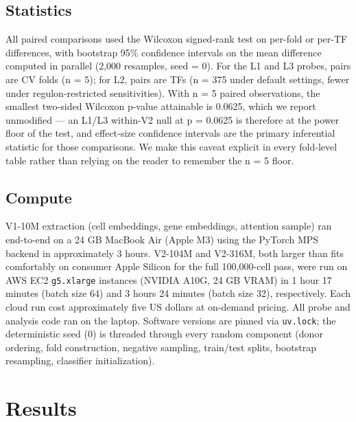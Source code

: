\documentclass[
  11pt,
]{article}
\begin{document}
\subsection{Statistics}\label{statistics}

All paired comparisons used the Wilcoxon signed-rank test \citep{wilcoxon1945} on per-fold or per-TF differences, with bootstrap 95\% confidence
intervals on the mean difference \citep{efron1979bootstrap} computed
in parallel (2,000 resamples, seed = 0). For the L1 and L3 probes, pairs are CV folds (n = 5); for
L2, pairs are TFs (n = 375 under default settings, fewer under
regulon-restricted sensitivities). With n = 5 paired observations, the
smallest two-sided Wilcoxon p-value attainable is 0.0625, which we
report unmodified --- an L1/L3 within-V2 null at p = 0.0625 is therefore
at the power floor of the test, and effect-size confidence intervals are
the primary inferential statistic for those comparisons. We make this
caveat explicit in every fold-level table rather than relying on the
reader to remember the n = 5 floor.

\subsection{Compute}\label{compute}

V1-10M extraction (cell embeddings, gene embeddings, attention sample)
ran end-to-end on a 24 GB MacBook Air (Apple M3) using the PyTorch MPS
backend in approximately 3 hours. V2-104M and V2-316M, both larger than
fits comfortably on consumer Apple Silicon for the full 100,000-cell
pass, were run on AWS EC2 \texttt{g5.xlarge} instances (NVIDIA A10G, 24
GB VRAM) in 1 hour 17 minutes (batch size 64) and 3 hours 24 minutes
(batch size 32), respectively. Each cloud run cost approximately five US
dollars at on-demand pricing. All probe and analysis code ran on the
laptop. Software versions are pinned via \texttt{uv.lock}; the
deterministic seed (0) is threaded through every random component (donor
ordering, fold construction, negative sampling, train/test splits,
bootstrap resampling, classifier initialization).

\section{Results}\label{results}
\end{document}
